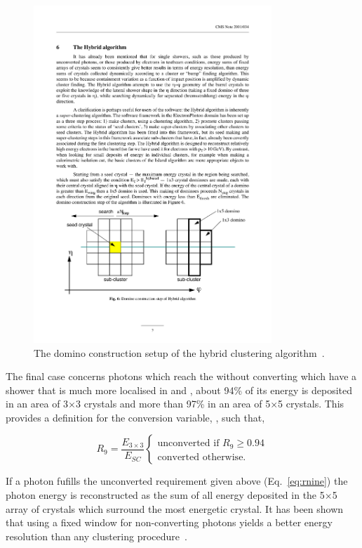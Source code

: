 \begin{figure}
  \includegraphics[width=0.8\textwidth]{cms_experiment/plots/hybrid_clustering.pdf}
  \caption{The domino construction setup of the hybrid clustering algorithm~\cite{ecal_electron_reco}.}
  \label{fig:hybrid_algo}
\end{figure}

The final case concerns photons which reach the \ECAL without converting which have a shower that is much more localised in \eta and \phi, about 94\% of its energy is deposited in an area of 3$\times$3 crystals and more than 97\% in an area of 5$\times$5 crystals. This provides a definition for the conversion variable, \rnine, such that, 

\begin{equation}
	R_{9} = \frac{E_{3\times3}}{E_{SC}} 
	\begin{cases}
		\text{unconverted if } R_9\geq0.94 \\
		\text{converted otherwise}.
	\end{cases}
  \label{eq:rnine}
\end{equation}

If a photon fufills the unconverted requirement given above (Eq.~\ref{eq:rnine}) the photon energy is reconstructed as the sum of all energy deposited in the 5$\times$5 array of crystals which surround the most energetic crystal. It has been shown that using a fixed window for non-converting photons yields a better energy resolution than any clustering procedure~\cite{ecal_electron_reco}.

